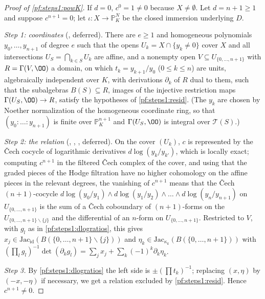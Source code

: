 \begin{proof}[Proof of \cref{pf:steps1:powK}]
If $d=0$, $c^0=1\ne0$ because $X\ne\emptyset$. Let $d=n+1\ge1$ and suppose $c^{n+1}=0$; let $\iota\colon X\to\mathbb P^N_K$ be the
closed immersion underlying $D$.

\emph{Step 1: coordinates} (, deferred). There are $e\ge1$ and homogeneous
polynomials $y_0,\dots,y_{n+1}$ of degree $e$ such that the opens $U_k=X\cap\{y_k\ne0\}$ cover $X$ and all intersections
$U_S=\bigcap_{k\in S}U_k$ are affine, and a nonempty open $V\subseteq U_{\{0,\dots,n+1\}}$ with $R=\Gamma(V,\OO)$ a domain, on which
$t_k=y_{k+1}/y_0$ ($0\le k\le n$) are units, algebraically independent over $K$, with derivations $\partial_k$ of $R$ dual to them, such
that the subalgebras $B(S)\subseteq R$, images of the injective restriction maps $\Gamma(U_S,\OO)\to R$, satisfy the hypotheses of
\cref{pf:steps1:resid}. (The $y_k$ are chosen by Noether normalization of the homogeneous coordinate ring, so that
$(y_0:\dots:y_{n+1})$ is finite over $\mathbb P^{n+1}_K$ and $\Gamma(U_S,\OO)$ is integral over $\mathcal T(S)$.)

\emph{Step 2: the relation} (,
, , deferred).
On the cover $(U_k)$, $c$ is represented by the \v{C}ech cocycle of logarithmic derivatives $d\log(y_k/y_{k'})$, which is locally
exact; computing $c^{n+1}$ in the filtered \v{C}ech complex of the cover, and using that the graded pieces of the Hodge filtration
have no higher cohomology on the affine pieces in the relevant degrees, the vanishing of $c^{n+1}$ means that the \v{C}ech
$(n+1)$-cocycle $d\log(y_0/y_1)\wedge d\log(y_1/y_2)\wedge\dots\wedge d\log(y_n/y_{n+1})$ on $U_{\{0,\dots,n+1\}}$ is the sum of a
\v{C}ech coboundary of $(n+1)$-forms on the $U_{\{0,\dots,n+1\}\smallsetminus\{j\}}$ and the differential of an $n$-form on
$U_{\{0,\dots,n+1\}}$. Restricted to $V$, with $g_l$ as in \cref{pf:steps1:dlogratios}, this gives $x_j\in
\mathrm{Jac}_{\mathrm{id}}(B(\{0,\dots,n+1\}\smallsetminus\{j\}))$ and $\eta_k\in\mathrm{Jac}_{\kappa_k}(B(\{0,\dots,n+1\}))$ with
$(\prod_lg_l)^{-1}\det(\partial_kg_l)=\sum_jx_j+\sum_k(-1)^k\partial_k\eta_k$.

\emph{Step 3.} By \cref{pf:steps1:dlogratios} the left side is $\pm(\prod t_k)^{-1}$; replacing $(x,\eta)$ by $(-x,-\eta)$ if
necessary, we get a relation excluded by \cref{pf:steps1:resid}. Hence $c^{n+1}\ne0$.
\end{proof}

